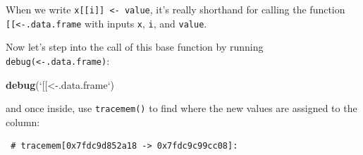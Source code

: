 \documentclass[]{book}
\newenvironment{Shaded}{\begin{snugshade}}{\end{snugshade}}
\newcommand{\CommentTok}[1]{\textcolor[rgb]{0.56,0.35,0.01}{\textit{#1}}}
\newcommand{\ControlFlowTok}[1]{\textcolor[rgb]{0.13,0.29,0.53}{\textbf{#1}}}
\newcommand{\DataTypeTok}[1]{\textcolor[rgb]{0.13,0.29,0.53}{#1}}
\newcommand{\KeywordTok}[1]{\textcolor[rgb]{0.13,0.29,0.53}{\textbf{#1}}}
\newcommand{\NormalTok}[1]{#1}
\newcommand{\OperatorTok}[1]{\textcolor[rgb]{0.81,0.36,0.00}{\textbf{#1}}}
\newcommand{\OtherTok}[1]{\textcolor[rgb]{0.56,0.35,0.01}{#1}}
\newcommand{\StringTok}[1]{\textcolor[rgb]{0.31,0.60,0.02}{#1}}
\begin{document}
When we write \texttt{x{[}{[}i{]}{]}\ \textless{}-\ value}, it's really shorthand for calling the function \texttt{{[}{[}\textless{}-.data.frame} with inputs \texttt{x}, \texttt{i}, and \texttt{value}.

Now let's step into the call of this base function by running \texttt{debug(\textasciigrave{}\textasciigrave{}{[}{[}\textless{}-.data.frame\textasciigrave{}\textasciigrave{})}:

\begin{Shaded}
\begin{Highlighting}[]
\KeywordTok{debug}\NormalTok{(}\StringTok{`}\DataTypeTok{[[<-.data.frame}\StringTok{`}\NormalTok{)}
\end{Highlighting}
\end{Shaded}

and once inside, use \texttt{tracemem()} to find where the new values are assigned to the column:

\begin{Shaded}
\end{Shaded}

\begin{verbatim}
 # tracemem[0x7fdc9d852a18 -> 0x7fdc9c99cc08]: 
\end{verbatim}
\end{document}

